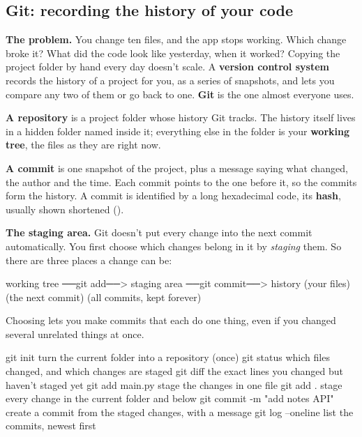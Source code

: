 \subsection{Git: recording the history of your code}

\textbf{The problem.} You change ten files, and the app stops working. Which change broke it? What did the code look like yesterday, when it worked? Copying the project folder by hand every day doesn't scale. A \textbf{version control system} records the history of a project for you, as a series of snapshots, and lets you compare any two of them or go back to one. \textbf{Git} is the one almost everyone uses.

\textbf{A repository} is a project folder whose history Git tracks. The history itself lives in a hidden folder named  inside it; everything else in the folder is your \textbf{working tree}, the files as they are right now.

\textbf{A commit} is one snapshot of the project, plus a message saying what changed, the author and the time. Each commit points to the one before it, so the commits form the history. A commit is identified by a long hexadecimal code, its \textbf{hash}, usually shown shortened ().

\textbf{The staging area.} Git doesn't put every change into the next commit automatically. You first choose which changes belong in it by \emph{staging} them. So there are three places a change can be:

\begin{code}
working tree  ──git add──>  staging area  ──git commit──>  history
(your files)                (the next commit)              (all commits, kept forever)
\end{code}

Choosing lets you make commits that each do one thing, even if you changed several unrelated things at once.

\begin{code}
git init                      turn the current folder into a repository (once)
git status                    which files changed, and which changes are staged
git diff                      the exact lines you changed but haven't staged yet
git add main.py               stage the changes in one file
git add .                     stage every change in the current folder and below
git commit -m "add notes API" create a commit from the staged changes, with a message
git log --oneline             list the commits, newest first
\end{code}

